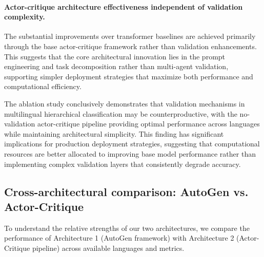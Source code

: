 \paragraph{Actor-critique architecture effectiveness independent of validation complexity.} The substantial improvements over transformer baselines are achieved primarily through the base actor-critique framework rather than validation enhancements. This suggests that the core architectural innovation lies in the prompt engineering and task decomposition rather than multi-agent validation, supporting simpler deployment strategies that maximize both performance and computational efficiency.

The ablation study conclusively demonstrates that validation mechanisms in multilingual hierarchical classification may be counterproductive, with the no-validation actor-critique pipeline providing optimal performance across languages while maintaining architectural simplicity. This finding has significant implications for production deployment strategies, suggesting that computational resources are better allocated to improving base model performance rather than implementing complex validation layers that consistently degrade accuracy.

\subsection{Cross-architectural comparison: AutoGen vs. Actor-Critique}

To understand the relative strengths of our two architectures, we compare the performance of Architecture 1 (AutoGen framework) with Architecture 2 (Actor-Critique pipeline) across available languages and metrics.

